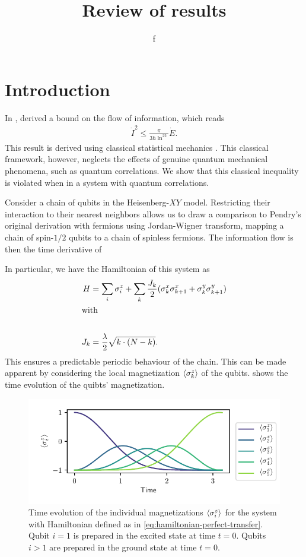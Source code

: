 \documentclass[a4paper,11pt]{scrartcl}
\author{f}
\title{Review of results}
\begin{document}
\maketitle
\section{Introduction}
In \citeyear{BA_Pendry_1983}, \citeauthor{BA_Pendry_1983} derived a bound on the flow of information, which reads
\begin{align}\label{eq:pendry}
    \dot{I}^2 \leq \frac{\pi}{3\hbar\ln^22}\dot{E}.
\end{align}
This result is derived using classical statistical mechanics \cite{BA_Pendry_1983}. This classical framework, however,
neglects the effects of genuine quantum mechanical phenomena, such as quantum correlations. We show that this
classical inequality is violated when in a system with quantum correlations.

Consider a chain of qubits in the Heisenberg-$XY$ model. Restricting their interaction to their nearest neighbors allows
us to draw a comparison to Pendry's original derivation with fermions using Jordan-Wigner transform, mapping a chain of
spin-$1/2$ qubits to a chain of spinless fermions. The information flow is then the time derivative of 

In particular, we have the Hamiltonian of this system as
\begin{align}\label{eq:hamiltonian-perfect-transfer}
    H &= \sum\limits_i \sigma^z_i + \sum\limits_k \frac{J_k}{2} (\sigma^x_k\sigma^x_{k+1}+\sigma^y_k\sigma^y_{k+1})\\
    \shortintertext{with}\\
    J_k &= \frac{\lambda}{2}\sqrt{k\cdot(N-k)}.\nonumber
\end{align}
This ensures a predictable periodic behaviour of the chain. This can be made apparent by considering the local
magnetization $\expval{\sigma^z_k}$ of the qubits.  shows the time evolution of the quibts'
magnetization.

\begin{figure}
    \centering
    \includegraphics{expval_z.pdf}
    \caption{Time evolution of the individual magnetizations $\expval{\sigma^z_i}$ for the system with
    Hamiltonian defined as in \cref{eq:hamiltonian-perfect-transfer}.
    Qubit $i=1$ is prepared in the excited state at time $t=0$.
    Qubits $i>1$ are prepared in the ground state at time $t=0$.}
    \label{fig:no-corr}
\end{figure}
\end{document}

